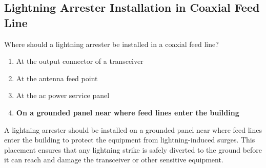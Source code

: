 \subsection{Lightning Arrester Installation in Coaxial Feed Line}
\label{T0A07}

\begin{tcolorbox}[colback=gray!10!white,colframe=black!75!black,title=T0A07]
Where should a lightning arrester be installed in a coaxial feed line?
\begin{enumerate}[noitemsep]
    \item At the output connector of a transceiver
    \item At the antenna feed point
    \item At the ac power service panel
    \item \textbf{On a grounded panel near where feed lines enter the building}
\end{enumerate}
\end{tcolorbox}

A lightning arrester should be installed on a grounded panel near where feed lines enter the building to protect the equipment from lightning-induced surges. This placement ensures that any lightning strike is safely diverted to the ground before it can reach and damage the transceiver or other sensitive equipment.